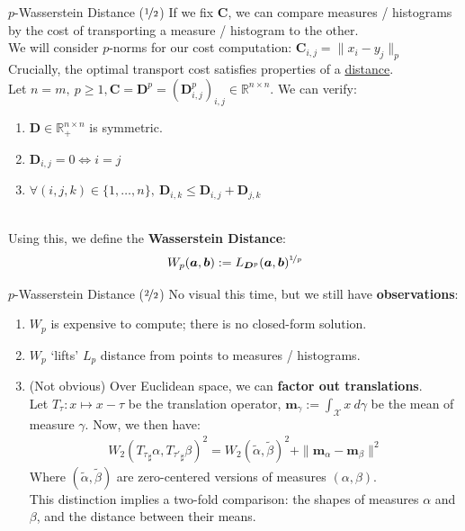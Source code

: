 \documentclass{beamer}
\begin{document}
\begin{frame}{$p$-Wasserstein Distance ($\nicefrac{1}{2}$)}
	If we fix $\bm{C}$, we can compare measures / histograms by the cost of transporting a measure / histogram to the other. \pause \newline \\
	
	We will consider $p$-norms for our cost computation: $\bm{C}_{i,j} = \| x_i  - y_j \|_p$ \pause \newline \\

	Crucially, the optimal transport cost satisfies properties of a \underline{distance}. \pause \newline \\

	Let $n = m,~p \geq 1, \bm{C} = \bm{D}^p = (\bm{D}^p_{i, j})_{i,j} \in \mathbb{R}^{n \times n}$. We can verify:
	\begin{enumerate}[label=\arabic*.]
		\item $\bm{D} \in \mathbb{R}^{n \times n}_+$ is symmetric. \pause
		\item $\bm{D}_{i,j} = 0 \iff i = j$ \pause
		\item $\forall (i, j, k) \in \{1, \ldots, n\},~\bm{D}_{i,k} \leq \bm{D}_{i, j} + \bm{D}_{j, k}$ \pause
	\end{enumerate}
	~ \\
	Using this, we define the \textbf{Wasserstein Distance}:
	\begin{gather}
		W_p (\bm{a}, \bm{b}) := L_{\bm{D}^p}(\bm{a}, \bm{b})^{\nicefrac{1}{p}}
	\end{gather}
\end{frame}

\begin{frame}{$p$-Wasserstein Distance ($\nicefrac{2}{2}$)}
	No visual this time, but we still have \textbf{observations}:
	\begin{enumerate}[label=\arabic*.]
		\item $W_p$ is expensive to compute; there is no closed-form solution. \pause
		\item $W_p$ `lifts' $L_p$ distance from points to measures / histograms. \pause
		\item (Not obvious) Over Euclidean space, we can \textbf{factor out translations}. \pause \newline \\
			Let $T_\tau : x \mapsto x - \tau$ be the translation operator, $\bm{m}_\gamma := \int_{\mathcal{X}} x~d\gamma$ be the mean of measure $\gamma$. Now, we then have:
			\begin{gather}
				W_2({T_\tau}_{\sharp} \alpha, {T_{\tau'}}_{\sharp} \beta)^2 = W_2(\tilde{\alpha}, \tilde{\beta})^2 + \| \bm{m}_\alpha - \bm{m}_\beta \|^2
			\end{gather}
			Where $(\tilde{\alpha}, \tilde{\beta})$ are zero-centered versions of measures $(\alpha, \beta)$. \pause \newline \\
			This distinction implies a two-fold comparison: the shapes of measures $\alpha$ and $\beta$, and the distance between their means.
	\end{enumerate}
\end{frame}
\end{document}
